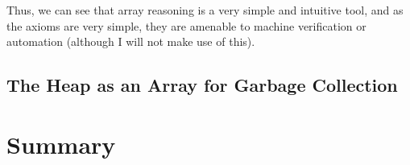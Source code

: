 Thus, we can see that array reasoning is a very simple and intuitive
tool, and as the axioms are very simple, they are amenable to machine
verification or automation (although I will not make use of this).

\subsection{The Heap as an Array for Garbage Collection}
\label{sec:heap-arrays-gc}


\section{Summary}
\label{sec:heap-summary}

